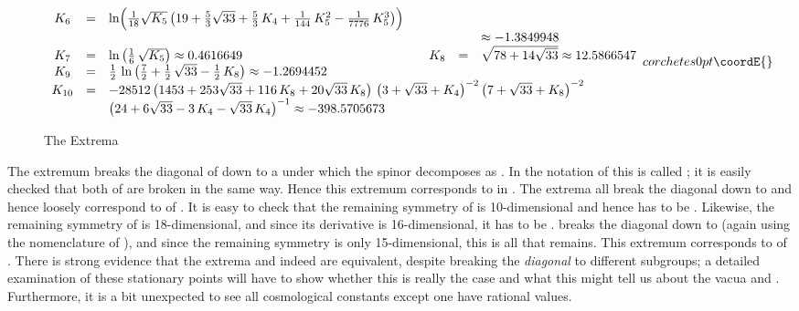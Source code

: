 \documentclass[a4paper,12pt]{article}
\begin{document}
\begin{landscape}
\begin{figure}
\[{\begin{array}{cclcccl}
K_6&=&\ln\Bigl(\frac{1}{18}\sqrt{K_5}\left(19+\frac{5}{3}\sqrt{33}+\frac{5}{3}\,K_4+\frac{1}{144}\,K_5^2-\frac{1}{7776}\,K_5^3\right)\Bigr)\\&&&&&&\approx-1.3849948\\
K_7&=&\ln\left(\frac{1}{6}\,\sqrt{K_5}\right)\approx0.4616649&&
K_8&=&\sqrt{78+14\sqrt{33}}\approx12.5866547\\
K_9&=&\frac{1}{2}\,\ln\left(\frac{7}{2}+\frac{1}{2}\,\sqrt{33}-\frac{1}{2}\,K_8\right)\approx-1.2694452\\
K_{10}&=&\multicolumn{5}{l}{-28512\left(1453+253\sqrt{33}+116\,K_8+20\sqrt{33}\,K_8\right)\,\left(3+\sqrt{33}+K_4\right)^{-2}\left(7+\sqrt{33}+K_8\right)^{-2}}\\
&&\left(24+6\sqrt{33}-3\,K_4-\sqrt{33}\,K_4\right)^{-1}\approx-398.5705673
\end{array}
}{corchetes}{0pt}\coordE{}\]
\caption{The Extrema}
\end{figure}
\end{landscape}

The extremum \coordHE{} breaks the diagonal \coordHE{} of \coordHE{}
down to a \coordHE{} under which the \coordHE{} spinor decomposes as \coordHE{}. In the notation of \cite{Warner:vz}
this is called \coordHE{}; it is easily checked that both \coordHE{} of
\coordHE{} are broken in the same way. Hence this extremum
corresponds to \coordHE{} in \cite{Warner:vz}. The extrema \coordHE{}
all break the diagonal \coordHE{} down to \coordHE{} and hence
loosely correspond to \coordHE{} of \cite{Warner:vz}. It is easy to check
that the remaining symmetry of \coordHE{} is 10-dimensional and hence has
to be \coordHE{}. Likewise, the remaining symmetry
of \coordHE{} is 18-dimensional, and since its derivative is
16-dimensional, it has to be \coordHE{}. \coordHE{} breaks the diagonal \coordHE{} down to \coordHE{} (again
using the nomenclature of \cite{Warner:vz}), and since the remaining
symmetry is only 15-dimensional, this is all that remains. This
extremum corresponds to \coordHE{} of \cite{Warner:vz}. There is strong
evidence that the extrema \coordHE{} and \coordHE{} indeed are equivalent,
despite breaking the {\em diagonal} \coordHE{} to different subgroups; a
detailed examination of these stationary points will have to show
whether this is really the case and what this might tell us about the
\coordHE{} vacua \coordHE{} and \coordHE{}. Furthermore, it is a bit unexpected to
see all cosmological constants except one have rational values.
\end{document}
